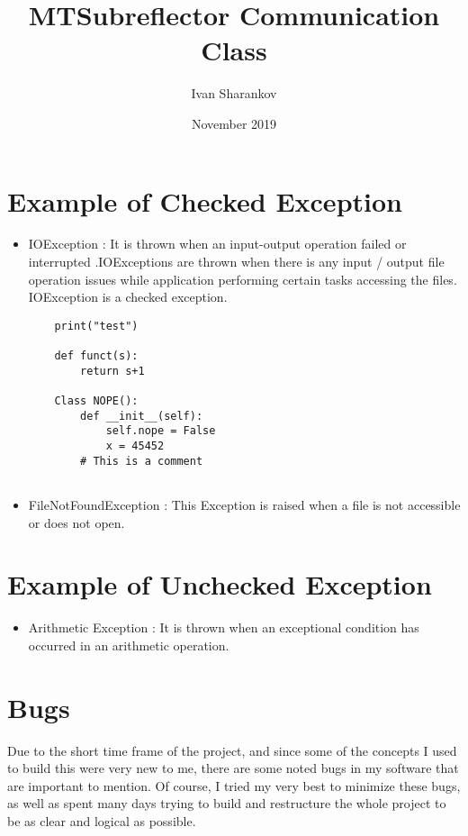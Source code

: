 \documentclass{article}
\title{MTSubreflector Communication Class}
\author{Ivan Sharankov }
\date{November 2019}
\begin{document}
\maketitle

\section{Example of Checked Exception}
\begin{itemize}
    \item IOException : It is thrown when an input-output operation failed or interrupted .IOExceptions are thrown when there is any input / output file operation issues while application performing certain tasks accessing the files. IOException is a checked exception.
    
    \begin{itemize}
    \begin{lstlisting}
    print("test")
    
    def funct(s):
        return s+1
        
    Class NOPE():
        def __init__(self):
            self.nope = False
            x = 45452
        # This is a comment 
   
    \end{lstlisting}
    \end{itemize}
    \item FileNotFoundException : This Exception is raised when a file is not accessible or does not open.

\end{itemize}


\section{Example of Unchecked Exception}
\begin{itemize}

\item Arithmetic Exception : It is thrown when an exceptional condition has occurred in an arithmetic operation.


\end{itemize}


\section{Bugs}

Due to the short time frame of the project, and since some of the concepts I used to build this were very new to me, there are some noted bugs in my software that are important to mention. Of course, I tried my very best to minimize these bugs, as well as spent many days trying to build and restructure the whole project to be as clear and logical as possible.  
\end{document}
